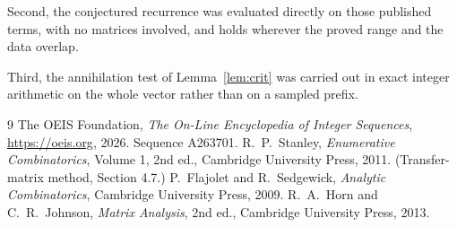 \documentclass[11pt,a4paper]{article}
\theoremstyle{plain}
\theoremstyle{definition}
\begin{document}
Second, the conjectured recurrence was evaluated directly on those published terms, with no
matrices involved, and holds wherever the proved range and the data overlap.

Third, the annihilation test of Lemma~\ref{lem:crit} was carried out in exact integer
arithmetic on the whole vector rather than on a sampled prefix.

\begin{thebibliography}{9}
 The OEIS Foundation, \emph{The On-Line Encyclopedia of Integer
Sequences}, \url{https://oeis.org}, 2026. Sequence A263701.
 R.~P.~Stanley, \emph{Enumerative Combinatorics}, Volume 1, 2nd ed.,
Cambridge University Press, 2011. (Transfer-matrix method, Section 4.7.)
 P.~Flajolet and R.~Sedgewick, \emph{Analytic Combinatorics}, Cambridge
University Press, 2009.
 R.~A.~Horn and C.~R.~Johnson, \emph{Matrix Analysis}, 2nd ed., Cambridge
University Press, 2013.
\end{thebibliography}
\end{document}
